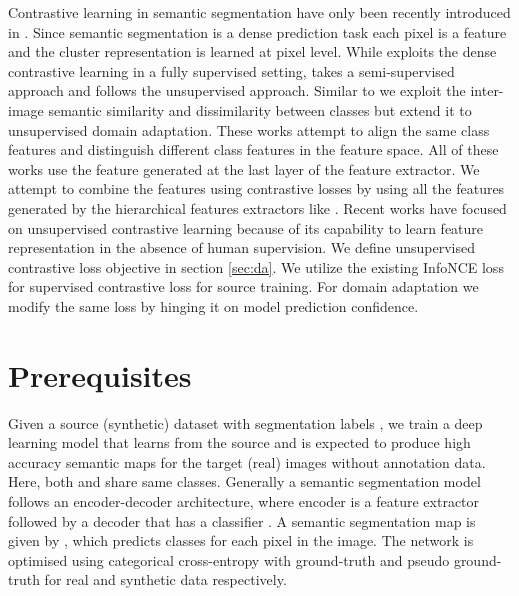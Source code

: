 \documentclass{article}
\begin{document}
Contrastive learning in semantic segmentation have only been recently introduced in \cite{hu2021region, zhong2021pixel, zhang2021looking, xie2021propagate, wang2021dense, lai2021semi, wang2021cross}. Since semantic segmentation is a dense prediction task each pixel is a feature and the cluster representation is learned at pixel level. While \cite{wang2021exploring} exploits the dense contrastive learning in a fully supervised setting, \cite{lai2021semi} takes a semi-supervised approach and \cite{xie2021propagate, wang2021dense} follows the unsupervised approach. Similar to \cite{wang2021exploring} we exploit the inter-image semantic similarity and dissimilarity between classes but extend it to unsupervised domain adaptation. These works attempt to align the same class features and distinguish different class features in the feature space. All of these works use the feature generated at the last layer of the feature extractor. We attempt to combine the features using contrastive losses by using all the features generated by the hierarchical features extractors like \cite{he2016deep, xie2021segformer, liu2021swin}. 
Recent works have focused on unsupervised contrastive learning \cite{he2020momentum,chen2020simple,cai2020joint,hadsell2006dimensionality,oord2018representation} because of its capability to learn feature representation in the absence of human supervision. We define unsupervised contrastive loss objective in section \ref{sec:da}. We utilize the existing InfoNCE\cite{gutmann2010noise} loss for supervised contrastive loss for source training. For domain adaptation we modify the same loss by hinging it on model prediction confidence.


\section{Prerequisites}\label{sec:prereqs}
Given a source (synthetic) dataset  with segmentation labels , we train a deep learning model that learns from the source and is expected to produce high accuracy semantic maps for the target (real) images  without annotation data. Here, both  and  share same  classes. Generally a semantic segmentation model follows an encoder-decoder architecture, where encoder is a feature extractor  followed by a decoder that has a classifier . A semantic segmentation map is given by , which predicts classes for each pixel in the image. The network is optimised using categorical cross-entropy  with ground-truth and pseudo ground-truth for real and synthetic data respectively. 
\end{document}
